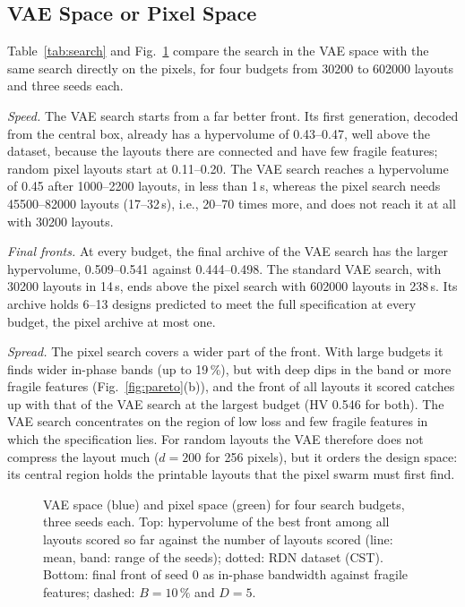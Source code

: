 \subsection{VAE Space or Pixel Space}
Table~\ref{tab:search} and Fig.~\ref{fig:spaces} compare the search in the VAE space with the same search directly on the pixels, for four budgets from \num{30200} to \num{602000} layouts and three seeds each.

\emph{Speed.} The VAE search starts from a far better front. Its first generation, decoded from the central box, already has a hypervolume of 0.43--0.47, well above the dataset, because the layouts there are connected and have few fragile features; random pixel layouts start at 0.11--0.20. The VAE search reaches a hypervolume of 0.45 after \num{1000}--\num{2200} layouts, in less than 1\,s, whereas the pixel search needs \num{45500}--\num{82000} layouts (17--32\,s), i.e., 20--70 times more, and does not reach it at all with \num{30200} layouts.

\emph{Final fronts.} At every budget, the final archive of the VAE search has the larger hypervolume, 0.509--0.541 against 0.444--0.498. The standard VAE search, with \num{30200} layouts in 14\,s, ends above the pixel search with \num{602000} layouts in 238\,s. Its archive holds 6--13 designs predicted to meet the full specification at every budget, the pixel archive at most one.

\emph{Spread.} The pixel search covers a wider part of the front. With large budgets it finds wider in-phase bands (up to 19\,\%), but with deep dips in the band or more fragile features (Fig.~\ref{fig:pareto}(b)), and the front of all layouts it scored catches up with that of the VAE search at the largest budget (HV 0.546 for both). The VAE search concentrates on the region of low loss and few fragile features in which the specification lies. For random layouts the VAE therefore does not compress the layout much ($d=200$ for 256 pixels), but it orders the design space: its central region holds the printable layouts that the pixel swarm must first find.

\begin{figure}[!t]
\centering
{}
\caption{VAE space (blue) and pixel space (green) for four search budgets, three seeds each. Top: hypervolume of the best front among all layouts scored so far against the number of layouts scored (line: mean, band: range of the seeds); dotted: RDN dataset (CST). Bottom: final front of seed 0 as in-phase bandwidth against fragile features; dashed: $B=10\,\%$ and $D=5$.}
\label{fig:spaces}
\end{figure}

